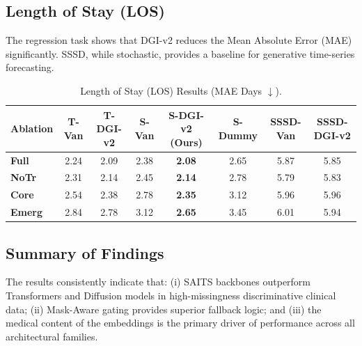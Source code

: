\subsection{Length of Stay (LOS)}
The regression task shows that DGI-v2 reduces the Mean Absolute Error (MAE) significantly. SSSD, while stochastic, provides a baseline for generative time-series forecasting.

\begin{table}[t]
\centering
\caption{Length of Stay (LOS) Results (MAE Days $\downarrow$).}
\label{tab:los_complete}
\begin{tabular}{lccccccc}
\toprule
\textbf{Ablation} & \textbf{T-Van} & \textbf{T-DGI-v2} & \textbf{S-Van} & \textbf{S-DGI-v2 (Ours)} & \textbf{S-Dummy} & \textbf{SSSD-Van} & \textbf{SSSD-DGI-v2} \\
\midrule
\textbf{Full}  & 2.24 & 2.09 & 2.38 & \textbf{2.08} & 2.65 & 5.87 & 5.85 \\
\textbf{NoTr}  & 2.31 & 2.14 & 2.45 & \textbf{2.14} & 2.78 & 5.79 & 5.83 \\
\textbf{Core}  & 2.54 & 2.38 & 2.78 & \textbf{2.35} & 3.12 & 5.96 & 5.96 \\
\textbf{Emerg} & 2.84 & 2.78 & 3.12 & \textbf{2.65} & 3.45 & 6.01 & 5.94 \\
\bottomrule
\end{tabular}
\end{table}

\subsection{Summary of Findings}
The results consistently indicate that: (i) SAITS backbones outperform Transformers and Diffusion models in high-missingness discriminative clinical data; (ii) Mask-Aware gating provides superior fallback logic; and (iii) the medical content of the embeddings is the primary driver of performance across all architectural families.
